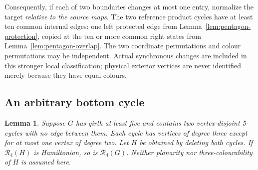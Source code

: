\documentclass[11pt]{article}
\newtheorem{lemma}[theorem]{Lemma}
\theoremstyle{remark}
\newcommand{\R}{\mathcal R}
\numberwithin{equation}{section}
\numberwithin{table}{section}
\begin{document}
Consequently, if each of two boundaries changes at most one entry,
normalize the target \emph{relative to the source maps}. The two
reference product cycles have at least ten common internal edges:
one left protected edge from Lemma~\ref{lem:pentagon-protection},
copied at the ten or more common right states from
Lemma~\ref{lem:pentagon-overlap}.
The two coordinate permutations and colour permutations may be
independent. Actual synchronous changes are included in this stronger
local classification; physical exterior vertices are never identified
merely because they have equal colours.

\subsection{An arbitrary bottom cycle}
\begin{lemma}\label{lem:two-pentagons-restore}
Suppose $G$ has girth at least five and contains two vertex-disjoint
5-cycles with no edge between them. Each cycle has vertices of degree
three except for at most one vertex of degree two.
Let $H$ be obtained by deleting both cycles. If $\R_4(H)$ is
Hamiltonian, so is $\R_4(G)$.
Neither planarity nor three-colourability of $H$ is assumed here.
\end{lemma}
\end{document}
